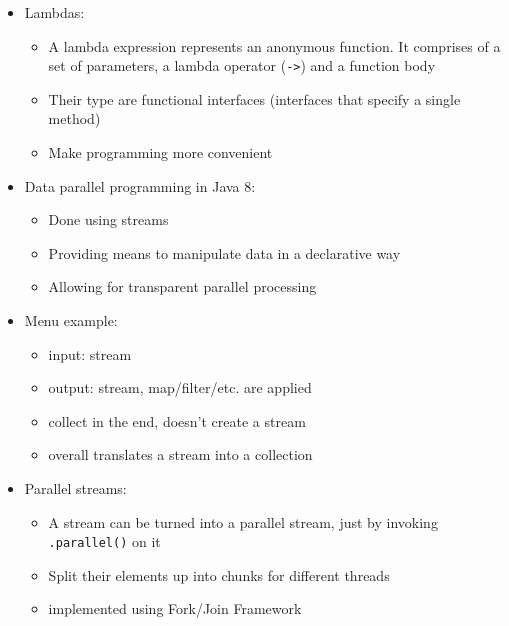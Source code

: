 \documentclass[a4paper]{article}
\newcommand{\inline}[1]{\lstinline!#1!}%
\begin{document}
\begin{itemize}
\item Lambdas:
\begin{itemize}
\item A lambda expression represents an anonymous function. It comprises of a set of parameters, a lambda operator (\inline{->}) and a function body
\item Their type are functional interfaces (interfaces that specify a single method)
\item Make programming more convenient
\end{itemize}
\item Data parallel programming in Java 8:
\begin{itemize}
\item Done using streams 
\item Providing means to manipulate data in a declarative way
\item Allowing for transparent parallel processing
\end{itemize}
\item Menu example: 
\begin{itemize}
\item input: stream
\item output: stream, map/filter/etc. are applied
\item collect in the end, doesn't create a stream
\item overall translates a stream into a collection
\end{itemize}
\item Parallel streams: 
\begin{itemize}
\item A stream can be turned into a parallel stream, just by invoking \inline{.parallel()} on it
\item Split their elements up into chunks for different threads
\item implemented using Fork/Join Framework
\end{itemize}
\end{itemize}
\end{document}

